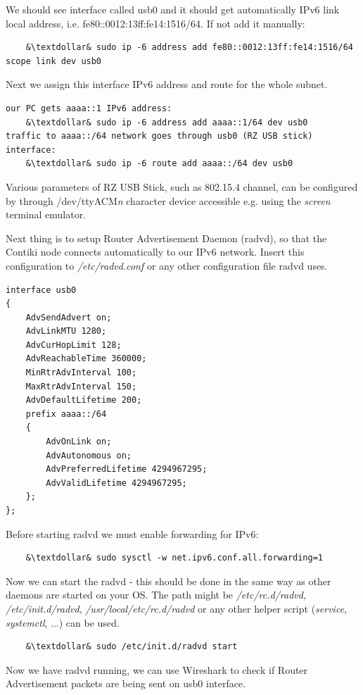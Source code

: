 \documentclass{article}
\begin{document}
We should see interface called usb0 and it should get automatically IPv6 link local address, i.e. fe80::0012:13ff:fe14:1516/64.
If not add it manually:
\begin{lstlisting}
	&\textdollar& sudo ip -6 address add fe80::0012:13ff:fe14:1516/64 scope link dev usb0
\end{lstlisting}
Next we assign this interface IPv6 address and route for the whole subnet.
\begin{lstlisting}
our PC gets aaaa::1 IPv6 address:
	&\textdollar& sudo ip -6 address add aaaa::1/64 dev usb0
traffic to aaaa::/64 network goes through usb0 (RZ USB stick) interface:
	&\textdollar& sudo ip -6 route add aaaa::/64 dev usb0
\end{lstlisting}
Various parameters of RZ USB Stick, such as 802.15.4 channel,
can be configured by through /dev/ttyACM{\it{n}} character device %
accessible e.g. using the {\it{screen}} terminal emulator.


Next thing is to setup Router Advertisement Daemon (radvd), so that the Contiki node connects automatically to our IPv6 network.
Insert this configuration to {\it{/etc/radvd.conf}} or any other configuration file radvd uses.
\begin{lstlisting}
interface usb0
{
    AdvSendAdvert on;
    AdvLinkMTU 1280;
    AdvCurHopLimit 128;
    AdvReachableTime 360000;
    MinRtrAdvInterval 100;
    MaxRtrAdvInterval 150;
    AdvDefaultLifetime 200;
    prefix aaaa::/64
    {
        AdvOnLink on;
        AdvAutonomous on;
        AdvPreferredLifetime 4294967295;
        AdvValidLifetime 4294967295;
    };
};
\end{lstlisting}
Before starting radvd we must enable forwarding for IPv6:
\begin{lstlisting}
	&\textdollar& sudo sysctl -w net.ipv6.conf.all.forwarding=1
\end{lstlisting}
Now we can start the radvd - this should be done in the same way as other daemons are started on your OS.
The path might be {\it{/etc/rc.d/radvd}}, {\it{/etc/init.d/radvd}}, {\it{/usr/local/etc/rc.d/radvd}}
or any other helper script ({\it{service}}, {\it{systemctl}}, ...) can be used.
\begin{lstlisting}
	&\textdollar& sudo /etc/init.d/radvd start
\end{lstlisting}

Now we have radvd running, we can use Wireshark to check if Router Advertisement packets are being sent on usb0 interface.
\end{document}
